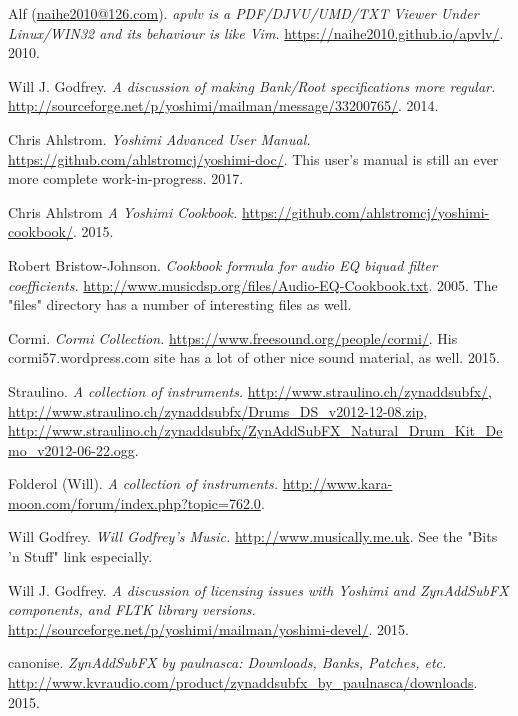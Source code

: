 \begin{thebibliography}{99}

   Alf (\href{mailto:naihe2010@126.com}{naihe2010@126.com}).
   \emph{apvlv is a PDF/DJVU/UMD/TXT Viewer Under Linux/WIN32 and its behaviour
   is like Vim.}
   \url{https://naihe2010.github.io/apvlv/}.
   2010.

   Will J. Godfrey.
   \emph{A discussion of making Bank/Root specifications more regular.}
   \url{http://sourceforge.net/p/yoshimi/mailman/message/33200765/}.
   2014.

   Chris Ahlstrom.
   \emph{Yoshimi Advanced User Manual.}
   \url{https://github.com/ahlstromcj/yoshimi-doc/}.
   This user's manual is still an ever more complete work-in-progress.
   2017.

   Chris Ahlstrom
   \emph{A Yoshimi Cookbook.}
   \url{https://github.com/ahlstromcj/yoshimi-cookbook/}.
   2015.

   Robert Bristow-Johnson.
   \emph{Cookbook formula for audio EQ biquad filter coefficients.}
   \url{http://www.musicdsp.org/files/Audio-EQ-Cookbook.txt}.
   2005.  The "files" directory has a number of interesting files as well.

   Cormi.
   \emph{Cormi Collection.}
   \url{https://www.freesound.org/people/cormi/}.
   His cormi57.wordpress.com site has a lot of other nice sound material, as well.
   2015.

   Straulino.
   \emph{A collection of instruments.}
   \url{http://www.straulino.ch/zynaddsubfx/},
   \url{http://www.straulino.ch/zynaddsubfx/Drums\_DS\_v2012-12-08.zip},
   \url{http://www.straulino.ch/zynaddsubfx/ZynAddSubFX\_Natural\_Drum\_Kit\_Demo\_v2012-06-22.ogg}.

   Folderol (Will).
   \emph{A collection of instruments.}
   \url{http://www.kara-moon.com/forum/index.php?topic=762.0}.

   Will Godfrey.
   \emph{Will Godfrey's Music.}
   \url{http://www.musically.me.uk}.
   See the "Bits 'n Stuff" link especially.

   Will J. Godfrey.
   \emph{A discussion of licensing issues with Yoshimi and ZynAddSubFX
   components, and FLTK library versions.}
   \url{http://sourceforge.net/p/yoshimi/mailman/yoshimi-devel/}.
   2015.

   canonise.
   \emph{ZynAddSubFX by paulnasca: Downloads, Banks, Patches, etc.}
   \url{http://www.kvraudio.com/product/zynaddsubfx\_by\_paulnasca/downloads}.
   2015.


\end{thebibliography}
